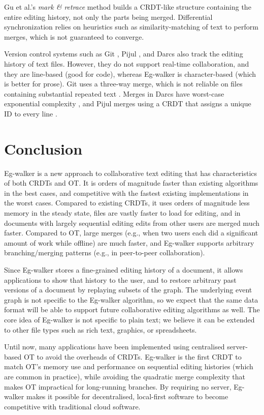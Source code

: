 \documentclass[sigplan,10pt]{acmart}
\newcommand{\algname}{Eg-walker\xspace}
\begin{document}
Gu et al.'s \emph{mark \& retrace} method \cite{Gu2005} builds a CRDT-like structure containing the entire editing history, not only the parts being merged.
Differential synchronization \cite{Fraser2009} relies on heuristics such as similarity-matching of text to perform merges, which is not guaranteed to converge.

Version control systems such as Git \cite{Coglan2019}, Pijul \cite{pijul}, and Darcs \cite{darcs} also track the editing history of text files.
However, they do not support real-time collaboration, and they are line-based (good for code), whereas \algname is character-based (which is better for prose).
Git uses a three-way merge, which is not reliable on files containing substantial repeated text \cite{Khanna2007}.
Merges in Darcs have worst-case exponential complexity \cite{darcs-book}, and Pijul merges using a CRDT that assigns a unique ID to every line \cite{pijul-theory}.

\section{Conclusion}

\algname is a new approach to collaborative text editing that has characteristics of both CRDTs and OT.
It is orders of magnitude faster than existing algorithms in the best cases, and competitive with the fastest existing implementations in the worst cases.
Compared to existing CRDTs, it uses orders of magnitude less memory in the steady state, files are vastly faster to load for editing, and in documents with largely sequential editing edits from other users are merged much faster.
Compared to OT, large merges (e.g., when two users each did a significant amount of work while offline) are much faster, and \algname supports arbitrary branching/merging patterns (e.g., in peer-to-peer collaboration).

Since \algname stores a fine-grained editing history of a document, it allows applications to show that history to the user, and to restore arbitrary past versions of a document by replaying subsets of the graph.
The underlying event graph is not specific to the \algname algorithm, so we expect that the same data format will be able to support future collaborative editing algorithms as well.
The core idea of \algname is not specific to plain text; we believe it can be extended to other file types such as rich text, graphics, or spreadsheets.

Until now, many applications have been implemented using centralised server-based OT to avoid the overheads of CRDTs.
\algname is the first CRDT to match OT's memory use and performance on sequential editing histories (which are common in practice), while avoiding the quadratic merge complexity that makes OT impractical for long-running branches.
By requiring no server, \algname makes it possible for decentralised, local-first software \cite{Kleppmann2019localfirst} to become competitive with traditional cloud software.
\end{document}
